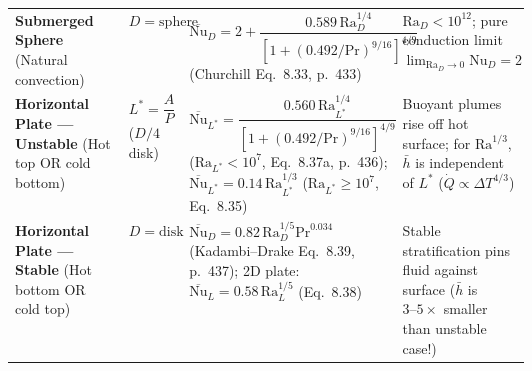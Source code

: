 \begin{table}[htbp]
\begin{tabularx}{\linewidth}{@{}L{0.25\linewidth} L{0.10\linewidth} X L{0.25\linewidth}@{}}
\textbf{Submerged Sphere} (Natural convection) & $D = \text{sphere diameter}$ & $\overline{\mathrm{Nu}}_D = 2 + \dfrac{0.589\,\mathrm{Ra}_D^{1/4}}{\left[1 + (0.492/\mathrm{Pr})^{9/16}\right]^{4/9}}$ (Churchill Eq.\ 8.33, p.\ 433) & $\mathrm{Ra}_D < 10^{12}$; pure conduction limit $\lim_{\mathrm{Ra}_D\to 0}\mathrm{Nu}_D = 2$ \\
\textbf{Horizontal Plate — Unstable} (Hot top OR cold bottom) & $L^* = \dfrac{A}{P}$ ($D/4$ disk) & $\overline{\mathrm{Nu}}_{L^*} = \dfrac{0.560\,\mathrm{Ra}_{L^*}^{1/4}}{\left[1 + (0.492/\mathrm{Pr})^{9/16}\right]^{4/9}}$ ($\mathrm{Ra}_{L^*} < 10^7$, Eq.\ 8.37a, p.\ 436); $\overline{\mathrm{Nu}}_{L^*} = 0.14\,\mathrm{Ra}_{L^*}^{1/3}$ ($\mathrm{Ra}_{L^*} \ge 10^7$, Eq.\ 8.35) & Buoyant plumes rise off hot surface; for $\mathrm{Ra}^{1/3}$, $\bar{h}$ is independent of $L^*$ ($\dot{Q} \propto \Delta T^{4/3}$) \\
\textbf{Horizontal Plate — Stable} (Hot bottom OR cold top) & $D = \text{disk diameter}$ & $\overline{\mathrm{Nu}}_D = 0.82\,\mathrm{Ra}_D^{1/5}\mathrm{Pr}^{0.034}$ (Kadambi--Drake Eq.\ 8.39, p.\ 437); 2D plate: $\overline{\mathrm{Nu}}_L = 0.58\,\mathrm{Ra}_L^{1/5}$ (Eq.\ 8.38) & Stable stratification pins fluid against surface ($\bar{h}$ is $3\text{--}5\times$ smaller than unstable case!) \\
\bottomrule
\end{tabularx}
\end{table}

